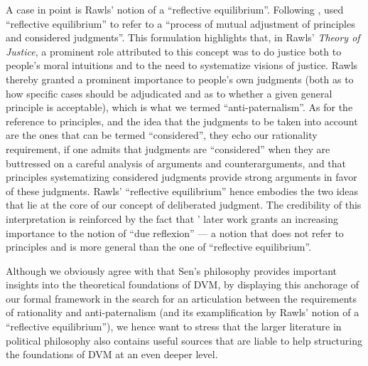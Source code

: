 \documentclass[version=3.21, pagesize, twoside=off, bibliography=totoc, DIV=calc, fontsize=12pt, a4paper, french, english]{scrartcl}
\begin{document}
A case in point is Rawls’ notion of a “reflective equilibrium”. Following \citet{goodman_fact_1983}, \citet[][p. 18]{rawls_theory_1999} used “reflective equilibrium” to refer to a “process of mutual adjustment of principles and considered judgments”. This formulation highlights that, in Rawls' \emph{Theory of Justice}, a prominent role attributed to this concept was to do justice both to people's moral intuitions and to the need to systematize visions of justice. Rawls thereby granted a prominent importance to people's own judgments (both as to how specific cases should be adjudicated and as to whether a given general principle is acceptable), which is what we termed  “anti-paternalism”. As for the reference to principles, and the idea that the judgments to be taken into account are the ones that can be termed “considered”, they echo our rationality requirement, if one admits that judgments are  “considered” when they are buttressed on a careful analysis of arguments and counterarguments, and that principles systematizing considered judgments provide strong arguments in favor of these judgments. Rawls' “reflective equilibrium” hence embodies the two ideas that lie at the core of our concept of deliberated judgment. The credibility of this interpretation is reinforced by the fact that \citeauthor{rawls_political_2005}’ \citeyearpar{rawls_political_2005} later work grants an increasing importance to the notion of “due reflexion” --- a notion that does not refer to principles and is more general than the one of “reflective equilibrium”.

Although we obviously agree with \citet{bartkowski_beyond_2018} that Sen's philosophy provides important insights into the theoretical foundations of DVM, by displaying this anchorage of our formal framework in the search for an articulation between the requirements of rationality and anti-paternalism (and its examplification by Rawls' notion of a “reflective equilibrium”), we hence want to stress that the larger literature in political philosophy also contains useful sources that are liable to help structuring the foundations of DVM at an even deeper level. 
\end{document}
